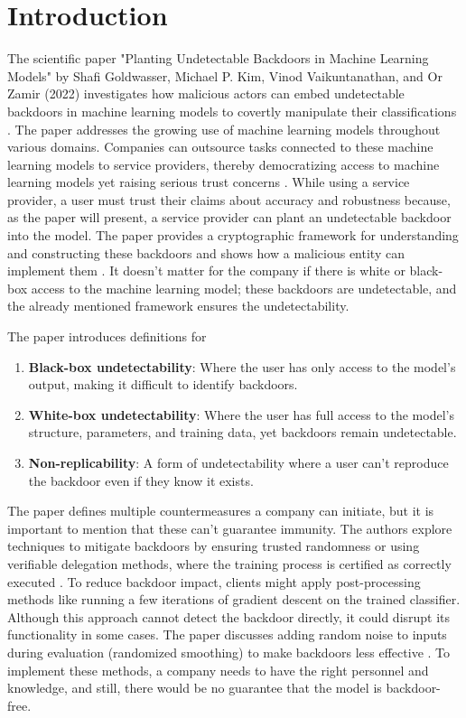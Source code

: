 \documentclass[
	fontsize=12pt,
	headings=small,
	parskip=quarter,
	bibliography=totoc,
	numbers=noenddot,       
	open=any,               
 	final                   
]{scrreprt}
\begin{document}
\chapter{Introduction}
The scientific paper "Planting Undetectable Backdoors in Machine Learning Models" by Shafi Goldwasser, Michael P. Kim, Vinod Vaikuntanathan, and Or Zamir (2022) investigates how malicious actors can embed undetectable backdoors in machine learning models to covertly manipulate their classifications \cite{goldwasser2022backdoors}. The paper addresses the growing use of machine learning models throughout various domains. Companies can outsource tasks connected to these machine learning models to service providers, thereby democratizing access to machine learning models yet raising serious trust concerns \cite{gu2017badnets}. While using a service provider, a user must trust their claims about accuracy and robustness because, as the paper will present, a service provider can plant an undetectable backdoor into the model. The paper provides a cryptographic framework for understanding and constructing these backdoors and shows how a malicious entity can implement them \cite{liu2018trojaning}. It doesn’t matter for the company if there is white or black-box access to the machine learning model; these backdoors are undetectable, and the already mentioned framework ensures the undetectability.
\par The paper introduces definitions for  
\begin{enumerate} \itemsep -5pt
	\item \textbf{Black-box undetectability}: Where the user has only access to the model's output, making it difficult to identify backdoors. 
	\item \textbf{White-box undetectability}: Where the user has full access to the model's structure, parameters, and training data, yet backdoors remain undetectable. 
	\item \textbf{Non-replicability}: A form of undetectability where a user can't reproduce the backdoor even if they know it exists. 
\end{enumerate}
\par The paper defines multiple countermeasures a company can initiate, but it is important to mention that these can't guarantee immunity. The authors explore techniques to mitigate backdoors by ensuring trusted randomness or using verifiable delegation methods, where the training process is certified as correctly executed \cite{song2017machine}. To reduce backdoor impact, clients might apply post-processing methods like running a few iterations of gradient descent on the trained classifier. Although this approach cannot detect the backdoor directly, it could disrupt its functionality in some cases. The paper discusses adding random noise to inputs during evaluation (randomized smoothing) to make backdoors less effective \cite{madry2018adversarial}. To implement these methods, a company needs to have the right personnel and knowledge, and still, there would be no guarantee that the model is backdoor-free.
\end{document}
